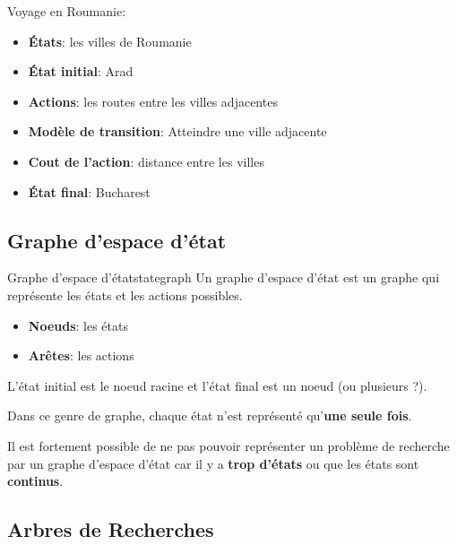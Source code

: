 \begin{example}\leavevmode
    Voyage en Roumanie:
    \begin{itemize}
        \item \textbf{États}: les villes de Roumanie
        \item \textbf{État initial}: Arad
        \item \textbf{Actions}: les routes entre les villes adjacentes
        \item \textbf{Modèle de transition}: Atteindre une ville adjacente
        \item \textbf{Cout de l'action}: distance entre les villes
        \item \textbf{État final}: Bucharest 
    \end{itemize}
\end{example}


\subsection{Graphe d'espace d'état} %
\label{sub:graphe_d_espace_d_etat}

\begin{definition}{Graphe d'espace d'état}{stategraph}
    Un graphe d'espace d'état est un graphe qui représente les états et les actions possibles.
    \begin{itemize}
        \item \textbf{Noeuds}: les états
        \item \textbf{Arêtes}: les actions
    \end{itemize} 
    L'état initial est le noeud racine et l'état final est un noeud (ou plusieurs ?).
\end{definition}

\begin{warning}
    Dans ce genre de graphe, chaque état n'est représenté qu'\textbf{une seule fois}.
\end{warning}

\begin{remark}\leavevmode
    Il est fortement possible de ne pas pouvoir représenter un problème de recherche par un graphe d'espace d'état car 
    il y a \textbf{trop d'états} ou que les états sont \textbf{continus}.
\end{remark}


\subsection{Arbres de Recherches} %
\label{sub:arbres_de_recherches}

